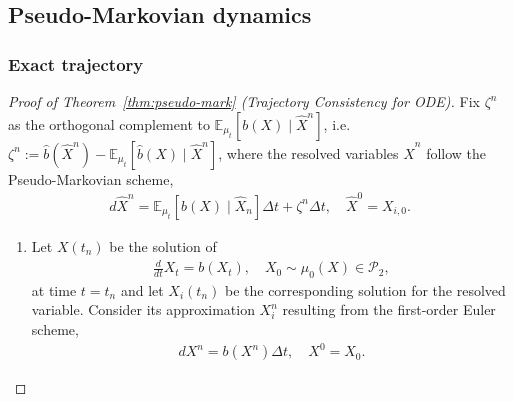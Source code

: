 \documentclass[11pt, a4paper, oneside, reqno]{amsart}
\begin{document}
\subsection{Pseudo-Markovian dynamics}
\subsubsection{Exact trajectory}
\begin{proof}[Proof of Theorem~\ref{thm:pseudo-mark} (Trajectory Consistency for ODE)]\label{proof:pseudomark}
Fix $\zeta^n$ as the orthogonal complement to $\mathbb{E}_{\mu_t}[b(X)\mid \hat{X}^n]$, i.e. $\zeta^n:= \hat{b}(\hat{X}^n) - \mathbb{E}_{\mu_t}[\hat{b}(X)\mid \hat{X}^n]$, where the resolved variables $\hat{X}^n$ follow
the Pseudo-Markovian scheme,
    \begin{eqnarray}
        d\hat{X}^n=\mathbb{E}_{\mu_t}[\hat{b}(X)\mid \hat{X}_n]\Delta t + \zeta^n\Delta t, \quad \hat{X}^0 = X_{i,0}. %
    \end{eqnarray}
\begin{enumerate}
    \item Let $X(t_n)$ be the solution of
    \begin{eqnarray}
        \frac{d}{dt}X_t=b(X_t), \quad X_0\sim\mu_0(X)\in\mathcal{P}_2,
    \end{eqnarray}
    at time $t=t_n$ and let $X_i(t_n)$ be the corresponding solution for the resolved variable. Consider its approximation $X_i^n$ resulting from the first-order Euler scheme,
    \begin{eqnarray}
        dX^n=b(X^n)\Delta t, \quad X^0=X_0.
    \end{eqnarray}

\end{enumerate}
\end{proof}
\end{document}
